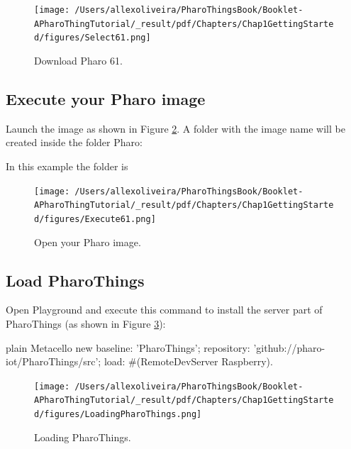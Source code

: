 \documentclass[10pt,twoside,english]{_support/latex/sbabook/sbabook}
\begin{document}
\begin{figure}

\begin{center}
\texttt{[image: /Users/allexoliveira/PharoThingsBook/Booklet-APharoThingTutorial/\_result/pdf/Chapters/Chap1GettingStarted/figures/Select61.png]}\caption{Download Pharo 61.\label{InstallPharo61}}\end{center}
\end{figure}

\subsection{Execute your Pharo image}
Launch the image as shown in Figure \ref{Execute61}. A folder with the image name will be created inside the folder Pharo:  

In this example the folder is  


\begin{figure}

\begin{center}
\texttt{[image: /Users/allexoliveira/PharoThingsBook/Booklet-APharoThingTutorial/\_result/pdf/Chapters/Chap1GettingStarted/figures/Execute61.png]}\caption{Open your Pharo image.\label{Execute61}}\end{center}
\end{figure}

\subsection{Load PharoThings}
Open Playground and execute this command to install the server part of PharoThings (as shown in Figure \ref{LoadingPharoThings}):

\begin{displaycode}{plain}
Metacello new
	baseline: 'PharoThings';
	repository: 'github://pharo-iot/PharoThings/src';
	load: #(RemoteDevServer Raspberry).
\end{displaycode}


\begin{figure}

\begin{center}
\texttt{[image: /Users/allexoliveira/PharoThingsBook/Booklet-APharoThingTutorial/\_result/pdf/Chapters/Chap1GettingStarted/figures/LoadingPharoThings.png]}\caption{Loading PharoThings.\label{LoadingPharoThings}}\end{center}
\end{figure}
\end{document}

